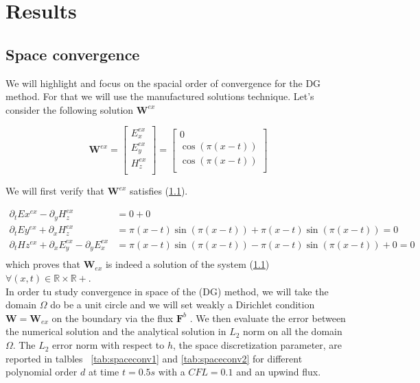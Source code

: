 \documentclass[a4paper,oneside,10pt]{report}
\begin{document}
\chapter{Results}
\section{Space convergence}

We will highlight and focus on the spacial order of convergence for the DG method. For that we will use the manufactured solutions technique. Let's consider the following solution $\mathbf{W}^{ex}$

\begin{equation}
\mathbf{W}^{ex}=
\begin{bmatrix}
E_x^{ex}\\
E_y^{ex}\\
H_z^{ex}\\
\end{bmatrix}
=
\begin{bmatrix}
0\\
\cos(\pi(x-t))\\
\cos(\pi(x-t))\\
\end{bmatrix}
\end{equation}

We will first verify that $\mathbf{W}^{ex}$ satisfies (\ref{}).


\begin{equation}
\begin{aligned}
\partial_t Ex^{ex} - \partial_y H_z^{ex} &= 0 + 0\\
\partial_t Ey^{ex} + \partial_x H_z^{ex} &= \pi(x-t)\sin(\pi(x-t)) +\pi(x-t)\sin(\pi(x-t)) = 0\\
\partial_t Hz^{ex} + \partial_x E_y^{ex} - \partial_y E_x^{ex}  &= \pi(x-t)\sin(\pi(x-t)) - \pi(x-t)\sin(\pi(x-t)) + 0 = 0\\
\end{aligned}
\end{equation}
which proves that $\mathbf{W}_{ex}$ is indeed a solution of the system  (\ref{}) $\forall (x,t) \in \mathbb{R} \times \mathbb{R}+$.\\


In order tu study convergence in space of the (DG) method, we will take the domain $\Omega$ do be a unit circle and we will set weakly a Dirichlet condition $\mathbf{W} = \mathbf{W}_{ex}$ on the boundary via the flux $\mathbf{F}^b$ . We then evaluate the error between the numerical solution and the analytical solution in $L_2$ norm on all the domain $\Omega$. The $L_2$ error norm with respect to $h$, the space discretization parameter, are reported in talbles ~\ref{tab:spaceconv1} and \ref{tab:spaceconv2} for different polynomial order $d$ at time $t=0.5s$ with a $CFL=0.1$ and an upwind flux.
\end{document}

